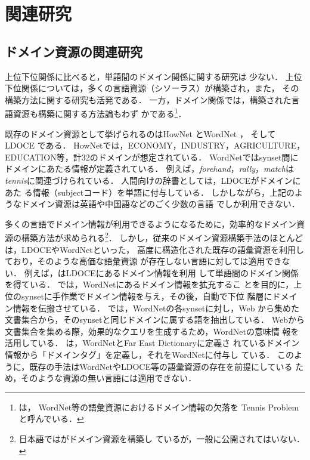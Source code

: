 \documentclass[japanese]{jnlp_1.4}
\begin{document}
\section{関連研究 \label{related-work}}

\subsection{ドメイン資源の関連研究}

上位下位関係に比べると，単語間のドメイン関係に関する研究は
少ない．
上位下位関係については，多くの言語資源（シソーラス）が構築され，また，
その構築方法に関する研究も活発である．
一方，ドメイン関係では，構築された言語資源も構築に関する方法論もわず
かである\footnote{
は，
WordNet等の語彙資源におけるドメイン情報の欠落を
Tennis Problemと呼んでいる．
}．

既存のドメイン資源として挙げられるのはHowNet
\cite{HowNet:Dong:Dong:2006}とWordNet \cite{Fellbaum:WordNet:1998}，
そしてLDOCE \cite{LDOCE:1987}である．
HowNetでは，ECONOMY，INDUSTRY，AGRICULTURE，
EDUCATION等，計32のドメインが想定されている．
WordNetではsynset間にドメインにあたる情報が定義されている．
例えば，\textit{forehand}，\textit{rally}，\textit{match}は
\textit{tennis}に関連づけられている．
人間向けの辞書としては，LDOCEがドメインにあた
る情報（subjectコード）を単語に付与している．
しかしながら，上記のようなドメイン資源は英語や中国語などのごく少数の言語
でしか利用できない．

多くの言語でドメイン情報が利用できるようになるために，効率的なドメイン資
源の構築方法が求められる\footnote{
日本語ではがドメイン資源を構築し
ているが，一般に公開されてはいない．
}．
しかし，従来のドメイン資源構築手法のほとんどは，LDOCEやWordNetといった，
高度に構造化された既存の語彙資源を利用しており，そのような高価な語彙資源
が存在しない言語に対しては適用できない．
例えば，はLDOCEにあるドメイン情報を利用
して単語間のドメイン関係を得ている．
では，WordNetにあるドメイン情報を拡充するこ
とを目的に，上位のsynsetに手作業でドメイン情報を与え，その後，自動で下位
階層にドメイン情報を伝搬させている．
では，WordNetの各synsetに対し，Web
から集めた文書集合から，そのsynsetと同じドメインに属する語を抽出している．
Webから文書集合を集める際，効果的なクエリを生成するため，WordNetの意味情
報を活用している．
は，WordNetとFar East Dictionaryに定義さ
れているドメイン情報から「ドメインタグ」を定義し，それをWordNetに付与し
ている．
このように，既存の手法はWordNetやLDOCE等の語彙資源の存在を前提にしている
ため，そのような資源の無い言語には適用できない．
\end{document}
